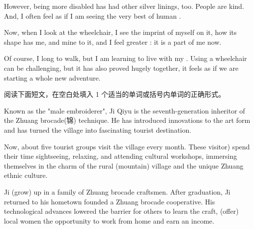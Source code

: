 \documentclass{英语试卷}
\begin{document}
\par However, being more  disabled has had other silver linings, too. People are kind. And, I often feel as if I am seeing the very best of human .\par
\par Now, when I look at the wheelchair, I see the imprint of myself on it, how its shape has  me, and mine to it, and I feel greater : it is a part of me now.\par
\par Of course, I long to walk, but I am learning to live with my . Using a wheelchair can be challenging, but it has also proved hugely  together, it feels as if we are starting a whole new adventure.\par
{}
\par 阅读下面短文，在空白处填入 1 个适当的单词或括号内单词的正确形式。\par
\par Known as the "male embroiderer", Ji Qiyu is the seventh-generation inheritor of the Zhuang brocade(锦) technique. He has introduced innovations to the art form and has turned the village into \blanknum{} \blanknum{} fascinating tourist destination.\par
\par Now, about five tourist groups visit the village every month. These \blanknum{} visitor) spend their time sightseeing, relaxing, and attending cultural workshops, immersing themselves in the charm of the rural \blanknum{} (mountain) village and the unique Zhuang ethnic culture.\par
\par Ji  (grow) up in a family of Zhuang brocade craftsmen. After graduation, Ji returned to his hometown  founded a Zhuang brocade cooperative. His technological advances lowered the barrier for others to learn the craft,  (offer) local women the opportunity to work from home and earn an income.\par
\end{document}
